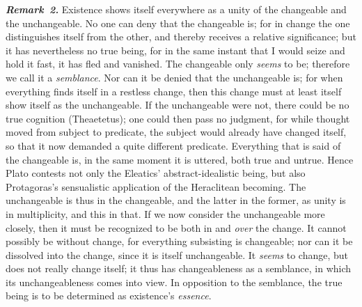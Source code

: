\documentclass[12pt]{book}
\newcommand{\anm}[1]{\emph{\textbf{Remark~#1.}}}
\begin{document}
\anm{2} Existence shows itself everywhere as a unity of the changeable and
the unchangeable. No one can deny that the changeable is; for in change the
one distinguishes itself from the other, and thereby receives a relative
significance; but it has nevertheless no true being, for in the same instant
that I would seize and hold it fast, it has fled and vanished. The
changeable only \emph{seems} to be; therefore we call it a \emph{semblance}.
Nor can it be denied that the unchangeable is; for when everything finds
itself in a restless change, then this change must at least itself show
itself as the unchangeable. If the unchangeable were not, there could be no
true cognition (Theaetetus); one could then pass no judgment, for while
thought moved from subject to predicate, the subject would already have
changed itself, so that it now demanded a quite different predicate.
Everything that is said of the changeable is, in the same moment it is
uttered, both true and untrue. Hence Plato contests not only the Eleatics'
abstract-idealistic being, but also Protagoras's sensualistic application of
the Heraclitean becoming. The unchangeable is thus in the changeable, and
the latter in the former, as unity is in multiplicity, and this in that. If
we now consider the unchangeable more closely, then it must be recognized to
be both in and \emph{over} the change. It cannot possibly be without change,
for everything subsisting is changeable; nor can it be dissolved into the
change, since it is itself unchangeable. It \emph{seems} to change, but does
not really change itself; it thus has changeableness as a semblance, in
which its unchangeableness comes into view. In opposition to the semblance,
the true being is to be determined as existence's \emph{essence}.
\end{document}
